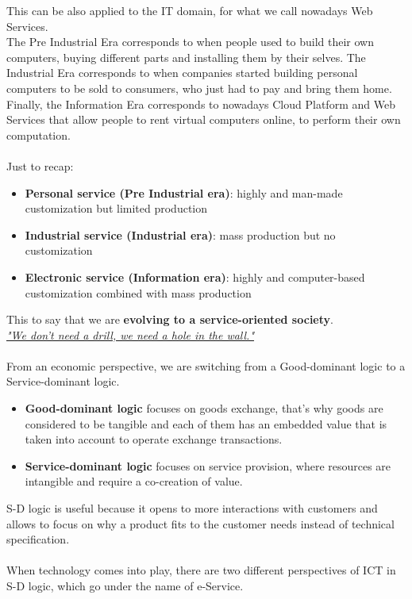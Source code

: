 \documentclass[10pt,a4paper]{article}
\begin{document}
This can be also applied to the IT domain, for what we call nowadays Web Services. \\
The Pre Industrial Era corresponds to when people used to build their own computers, buying different parts and installing them by their selves. The Industrial Era corresponds to when companies started building personal computers to be sold to consumers, who just had to pay and bring them home. Finally, the Information Era corresponds to nowadays Cloud Platform and Web Services that allow people to rent virtual computers online, to perform their own computation. \\ \\
Just to recap:
\begin{itemize}
	\item \textbf{Personal service (Pre Industrial era)}: highly and man-made customization but limited production
	\item \textbf{Industrial service (Industrial era)}: mass production but no customization
	\item \textbf{Electronic service (Information era)}: highly and computer-based customization combined with mass production
\end{itemize}
This to say that we are \textbf{evolving to a service-oriented society}. \\
\uline{\textit{"We don't need a drill, we need a hole in the wall."}} \\ \\ 
From an economic perspective, we are switching from a Good-dominant logic to a Service-dominant logic.
\begin{itemize}
	\item \textbf{Good-dominant logic} focuses on goods exchange, that's why goods are considered to be tangible and each of them has an embedded value that is taken into account to operate exchange transactions.
	\item \textbf{Service-dominant logic} focuses on service provision, where resources are  intangible and require a co-creation of value.
\end{itemize}
S-D logic is useful because it opens to more interactions with customers and allows to focus on why a product fits to the customer needs instead of technical specification. \\ \\
When technology comes into play, there are two different perspectives of ICT in S-D logic, which go under the name of e-Service.
\end{document}
